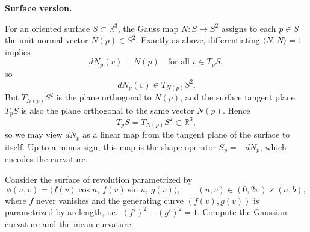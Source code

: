 \begin{solution}
	\par\medskip\noindent\textbf{Surface version.}\par\smallskip

	For an oriented surface $S\subset\mathbb R^3$, the Gauss map $N:S\to S^2$ assigns to each
	$p\in S$ the unit normal vector $N(p)\in S^2$.
	Exactly as above, differentiating $\langle N,N\rangle=1$ implies
	\[
	dN_p(v)\perp N(p)\quad\text{for all }v\in T_pS,
	\]
	so
	\[
	dN_p(v)\in T_{N(p)}S^2.
	\]
	But $T_{N(p)}S^2$ is the plane orthogonal to $N(p)$, and the surface tangent plane $T_pS$ is
	also the plane orthogonal to the same vector $N(p)$. Hence
	\[
	T_pS = T_{N(p)}S^2 \subset \mathbb R^3,
	\]
	so we may view $dN_p$ as a linear map from the tangent plane of the surface to itself.
	Up to a minus sign, this map is the shape operator $S_p=-dN_p$, which encodes the curvature.
\end{solution}

\begin{problem}
\label{prob:cp-vii-0051}
Consider the surface of revolution parametrized by
\[
\phi(u,v)=\bigl(f(v)\cos u,\ f(v)\sin u,\ g(v)\bigr),\qquad (u,v)\in(0,2\pi)\times(a,b),
\]
where $f$ never vanishes and the generating curve $(f(v),g(v))$ is parametrized by arclength,
i.e.\ $(f')^2+(g')^2=1$. Compute the Gaussian curvature and the mean curvature.

\medskip
\end{problem}

